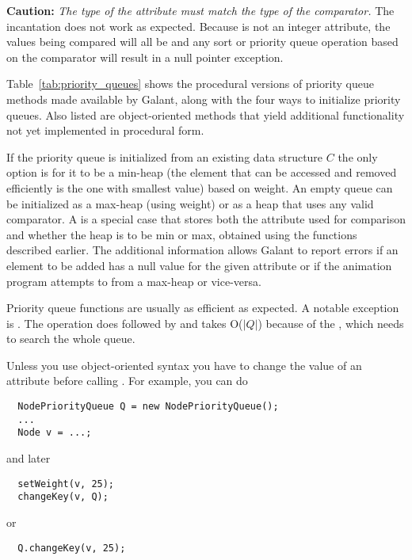 \textbf{Caution:} \emph{The type of the attribute must match the type of the
  comparator.}
The incantation  does not work as
expected.
Because  is not an integer attribute, the values being compared
will all be  and any sort or priority queue operation based on the
comparator will result in a null pointer exception.

Table~\ref{tab:priority_queues} shows the procedural versions of priority
queue methods made available by Galant, along with the four ways to
initialize priority queues. Also listed are object-oriented methods that
yield additional functionality not yet implemented in procedural form.

If the priority queue is initialized from an existing data structure $C$ the
only option is for it to be a min-heap (the element that can be accessed and
removed efficiently is the one with smallest value) based on weight.
An empty queue can be initialized as a max-heap (using weight) or as a heap
that uses any valid comparator.
A  is a special case that stores both the
attribute used for comparison and whether the heap is to be min or max,
obtained using the  functions described
earlier.
The additional information allows Galant to report errors if an element to be
added has a null value for the given attribute or if the animation program
attempts to  from a max-heap or vice-versa.

Priority queue functions are usually as efficient as expected.
A notable exception is .
The operation 
does  followed by 
and takes O($|Q|$) because of the , which needs to search the
whole queue.

Unless you use object-oriented syntax you have to change the value of an
attribute before calling . For example, you can do

\begin{minipage}{0.9\textwidth}
\begin{verbatim}
  NodePriorityQueue Q = new NodePriorityQueue();
  ...
  Node v = ...;
\end{verbatim}
\end{minipage}

and later

\begin{minipage}{0.4\textwidth}
\begin{verbatim}
  setWeight(v, 25);
  changeKey(v, Q);
\end{verbatim}
\end{minipage}
or
\begin{minipage}{0.4\textwidth}
\begin{verbatim}
  Q.changeKey(v, 25);
\end{verbatim}
\end{minipage}

